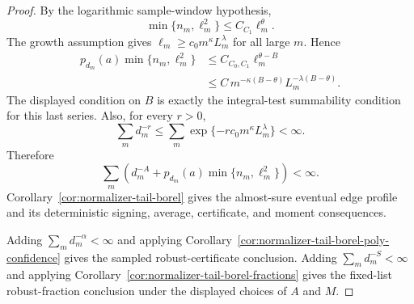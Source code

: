 \documentclass[11pt]{amsart}
\numberwithin{equation}{section}
\theoremstyle{definition}
\theoremstyle{remark}
\begin{document}
\begin{proof}
By the logarithmic sample-window hypothesis,
\[
  \min\{n_m,\ell_m^2\}\le C_{C_1}\ell_m^\theta .
\]
The growth assumption gives \(\ell_m\ge c_0m^\kappa L_m^\lambda\) for all large
\(m\).  Hence
\[
\begin{aligned}
  p_{d_m}(a)\min\{n_m,\ell_m^2\}
  &\le C_{C_0,C_1}\ell_m^{\theta-B}  \\
  &\le
  C\,m^{-\kappa(B-\theta)}L_m^{-\lambda(B-\theta)} .
\end{aligned}
\]
The displayed condition on \(B\) is exactly the integral-test summability
condition for this last series.  Also, for every \(r>0\),
\[
  \sum_m d_m^{-r}
  \le
  \sum_m \exp\{-rc_0m^\kappa L_m^\lambda\}
  <\infty .
\]
Therefore
\[
  \sum_m\left(d_m^{-A}
  +p_{d_m}(a)\min\{n_m,\ell_m^2\}\right)<\infty .
\]
Corollary~\ref{cor:normalizer-tail-borel} gives the almost-sure eventual edge
profile and its deterministic signing, average, certificate, and moment
consequences.

Adding \(\sum_m d_m^{-\alpha}<\infty\) and applying
Corollary~\ref{cor:normalizer-tail-borel-poly-confidence} gives the sampled
robust-certificate conclusion.  Adding \(\sum_m d_m^{-S}<\infty\) and applying
Corollary~\ref{cor:normalizer-tail-borel-fractions} gives the fixed-list
robust-fraction conclusion under the displayed choices of \(A\) and \(M\).
\end{proof}
\end{document}
